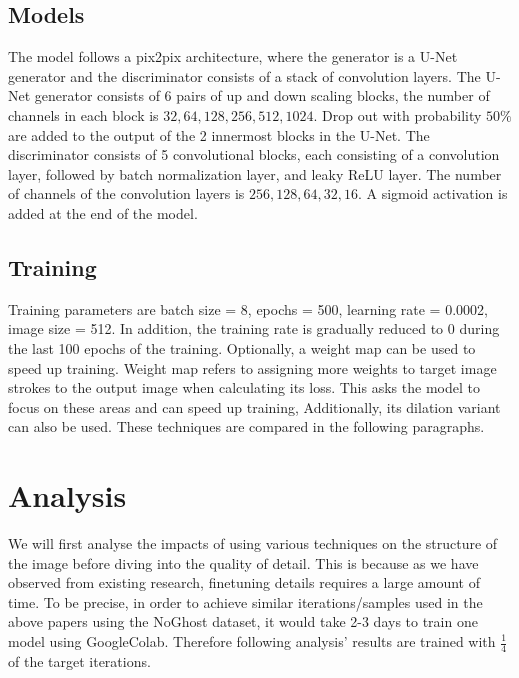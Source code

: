 \subsection{Models}
The model follows a pix2pix architecture, where the generator is a U-Net generator and the discriminator consists of a stack of convolution layers. The U-Net generator consists of 6 pairs of up and down scaling blocks, the number of channels in each block is $32, 64, 128, 256, 512, 1024$. Drop out with probability $50\%$ are added to the output of the 2 innermost blocks in the U-Net. The discriminator consists of 5 convolutional blocks, each consisting of a convolution layer, followed by batch normalization layer, and leaky ReLU layer. The number of channels of the convolution layers is $256, 128, 64, 32, 16$. A sigmoid activation is added at the end of the model.


\subsection{Training}
Training parameters are batch size = 8, epochs = 500, learning rate = 0.0002, image size = 512. In addition, the training rate is gradually reduced to 0 during the last 100 epochs of the training. Optionally, a weight map can be used to speed up training. Weight map refers to assigning more weights to target image strokes to the output image when calculating its loss. This asks the model to focus on these areas and can speed up training, Additionally, its dilation variant can also be used. These techniques are compared in the following paragraphs. 

\section{Analysis}

We will first analyse the impacts of using various techniques on the structure of the image before diving into the quality of detail. This is because as we have observed from existing research, finetuning details requires a large amount of time. To be precise, in order to achieve similar iterations/samples used in the above papers using the NoGhost dataset, it would take 2-3 days to train one model using GoogleColab. Therefore following analysis' results are trained with  $\frac{1}{4}$ of the target iterations.


